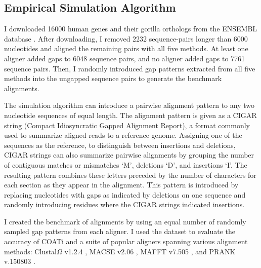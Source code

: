 \documentclass[12pt,letterpaper]{article}
\begin{document}
\subsection*{Empirical Simulation Algorithm}

I downloaded 16000 human genes and their gorilla orthologs from the ENSEMBL
database \citep{ensembl_hubbard_2002}.
After downloading, I removed 2232 sequence-pairs longer than 6000 nucleotides and aligned the remaining pairs with all five methods.
At least one aligner added gaps to 6048 sequence pairs, and no aligner added gaps to 7761 sequence pairs.
Then, I randomly introduced gap patterns extracted from all five methods into the ungapped sequence pairs to generate the benchmark alignments.

The simulation algorithm can introduce a pairwise alignment pattern to any two nucleotide sequences of equal length. The alignment pattern is given as a CIGAR string (Compact Idiosyncratic Gapped Alignment Report), a format commonly used to summarize aligned reads to a reference genome. Assigning one of the sequences as the reference, to distinguish between insertions and deletions, CIGAR strings can also summarize pairwise alignments by grouping the number of contiguous matches or mismatches `M', deletions `D', and insertions `I'. The resulting pattern combines these letters preceded by the number of characters for each section as they appear in the alignment. This pattern is introduced by replacing nucleotides with gaps as indicated by deletions on one sequence and randomly introducing residues where the CIGAR strings indicated insertions.


I created the benchmark of alignments by using an equal number of randomly sampled gap patterns from each aligner.
I used the dataset to evaluate the accuracy of COATi and a suite of popular aligners spanning various alignment methods:
Clustal$\Omega$ v1.2.4 \citep{clustal_omega_sievers_2011},
MACSE v2.06 \citep{ranwez_macse_2011}, MAFFT v7.505
\citep{katoh2013mafft}, and PRANK v.150803 \citep{prank_loytynoja_2014}.
\end{document}
